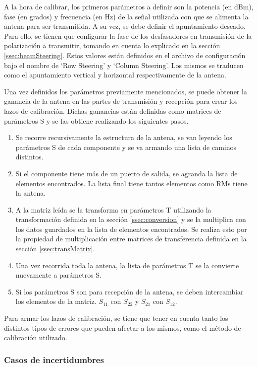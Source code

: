 A la hora de calibrar, los primeros parámetros a definir son la potencia (en dBm), fase (en grados) y frecuencia (en Hz) de la 
señal utilizada con que se alimenta la antena para ser transmitida. A su vez, se debe definir el apuntamiento deseado. Para 
ello, se tienen que configurar la fase de los desfasadores en transmisión de la polarización a transmitir, tomando en cuenta lo 
explicado en la sección \ref{ssec:beamSteering}. Estos valores están definidos en el archivo de configuración bajo el nombre 
de \enquote*{Row Steering} y \enquote*{Column Steering}. Los mismos se traducen como el apuntamiento vertical y horizontal 
respectivamente de la antena.

Una vez definidos los parámetros previamente mencionados, se puede obtener la ganancia de la antena en las partes de 
transmisión y recepción para crear los lazos de calibración. Dichas ganancias están definidas como matrices de parámetros
S y se las obtiene realizando los siguientes pasos.

\begin{enumerate}
	\item Se recorre recursivamente la estructura de la antena, se van leyendo los parámetros S de cada componente y se va 
		armando una lista de caminos distintos.
	\item Si el componente tiene más de un puerto de salida, se agranda la lista de elementos encontrados. La lista final tiene 
		tantos elementos como RMs tiene la antena.
	\item A la matriz leída se la transforma en parámetros T utilizando la transformación definida en la sección 
		\ref{ssec:conversion} y se la multiplica con los datos guardados en la lista de elementos encontrados. Se realiza esto 
		por la propiedad de multiplicación entre matrices de transferencia definida en la sección \ref{ssec:transMatrix}.
	\item Una vez recorrida toda la antena, la lista de parámetros T se la convierte nuevamente a parámetros S.
	\item Si los parámetros S son para recepción de la antena, se deben intercambiar los elementos de la matriz. $S_{11}$ con 
		$S_{22}$ y $S_{21}$ con $S_{12}$.
\end{enumerate}


Para armar los lazos de calibración, se tiene que tener en cuenta tanto los distintos tipos de errores que pueden afectar a los
mismos, como el método de calibración utilizado. 

\subsubsection{Casos de incertidumbres}

